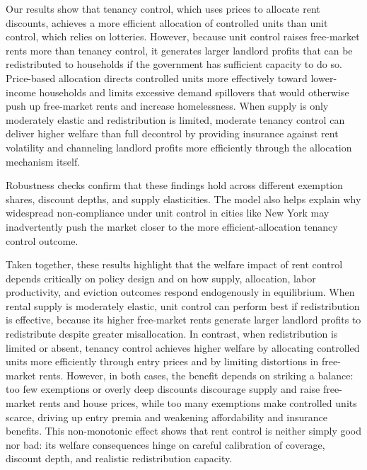 \documentclass[parskip=full]{article}
\begin{document}
Our results show that tenancy control, which uses prices to allocate rent discounts, achieves a more efficient allocation of controlled units than unit control, which relies on lotteries. However, because unit control raises free-market rents more than tenancy control, it generates larger landlord profits that can be redistributed to households if the government has sufficient capacity to do so. Price-based allocation directs controlled units more effectively toward lower-income households and limits excessive demand spillovers that would otherwise push up free-market rents and increase homelessness. When supply is only moderately elastic and redistribution is limited, moderate tenancy control can deliver higher welfare than full decontrol by providing insurance against rent volatility and channeling landlord profits more efficiently through the allocation mechanism itself.

Robustness checks confirm that these findings hold across different exemption shares, discount depths, and supply elasticities. The model also helps explain why widespread non-compliance under unit control in cities like New York may inadvertently push the market closer to the more efficient-allocation tenancy control outcome.

Taken together, these results highlight that the welfare impact of rent control depends critically on policy design and on how supply, allocation, labor productivity, and eviction outcomes respond endogenously in equilibrium. When rental supply is moderately elastic, unit control can perform best if redistribution is effective, because its higher free-market rents generate larger landlord profits to redistribute despite greater misallocation. In contrast, when redistribution is limited or absent, tenancy control achieves higher welfare by allocating controlled units more efficiently through entry prices and by limiting distortions in free-market rents. However, in both cases, the benefit depends on striking a balance: too few exemptions or overly deep discounts discourage supply and raise free-market rents and house prices, while too many exemptions make controlled units scarce, driving up entry premia and weakening affordability and insurance benefits. This non-monotonic effect shows that rent control is neither simply good nor bad: its welfare consequences hinge on careful calibration of coverage, discount depth, and realistic redistribution capacity.



\end{document}
